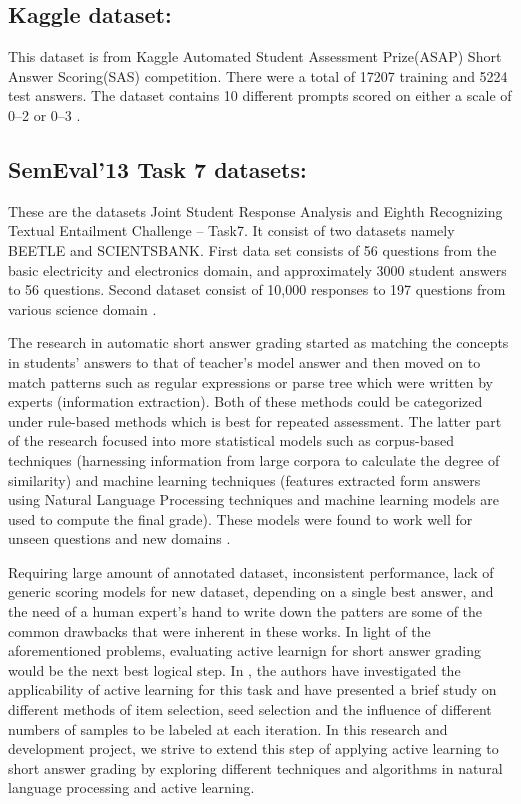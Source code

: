 \documentclass[rnd]{mas_proposal}
\begin{document}
\subsection{Kaggle dataset:}
This dataset is from Kaggle Automated Student Assessment Prize(ASAP) Short Answer Scoring(SAS) competition. There were a total of 17207 training and 5224 test answers. The dataset contains 10 different prompts scored on either a scale of 0–2 or 0–3 \cite{kaggle}.

\subsection{SemEval’13 Task 7 datasets:}
These are the datasets Joint Student Response Analysis and Eighth Recognizing Textual Entailment Challenge – Task7. It consist of two datasets namely BEETLE and SCIENTSBANK. First data set consists of 56 questions from the basic electricity and electronics domain, and approximately 3000 student answers to 56 questions. Second dataset consist of 10,000 responses to 197 questions from various science domain \cite{dzikovska2013}.



    \newpage
    
The research in automatic short answer grading started as matching the concepts in students' answers to that of teacher's model answer and then moved on to match patterns such as regular expressions or parse tree which were written by experts (information extraction). Both of these methods could be categorized under rule-based methods which is best for repeated assessment. The latter part of the research focused into more statistical models such as corpus-based techniques (harnessing information from large corpora to calculate the degree of similarity) and machine learning techniques (features extracted form answers using Natural Language Processing techniques and machine learning models are used to compute the final grade). These models were found to work well for unseen questions and new domains \cite{Burrows2015}.

\vspace{5mm}

Requiring large amount of annotated dataset, inconsistent performance, lack of generic scoring models for new dataset, depending on a single best answer, and the need of a human expert's hand to write down the patters are some of the common drawbacks that were inherent in these works. In light of the aforementioned problems, evaluating active learnign for short answer grading would be the next best logical step. In \cite{Horbach2016}, the authors have investigated the applicability of active learning for this task and have presented a brief study on different methods of item selection, seed selection and the influence of different numbers of samples to be labeled at each iteration. In this research and development project, we strive to extend this step of applying active learning to short answer grading by exploring different techniques and algorithms in natural language processing and active learning. 
\end{document}
